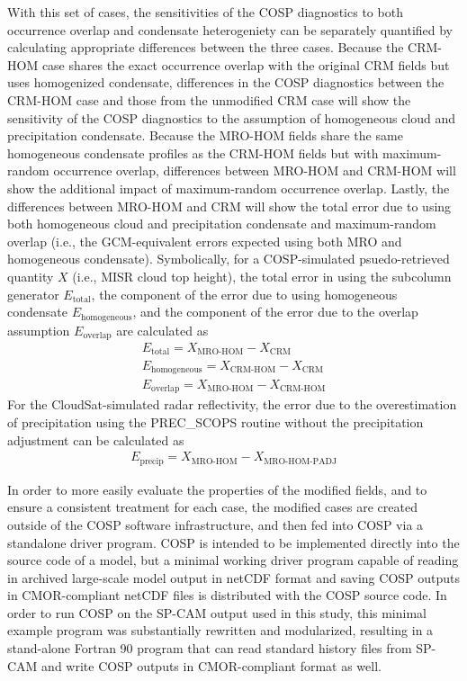 With this set of cases, the sensitivities of the COSP diagnostics to
both occurrence overlap and condensate heterogeniety can be separately
quantified by calculating appropriate differences between the three
cases. Because the CRM-HOM case shares the exact occurrence overlap with
the original CRM fields but uses homogenized condensate, differences in
the COSP diagnostics between the CRM-HOM case and those from the
unmodified CRM case will show the sensitivity of the COSP diagnostics to
the assumption of homogeneous cloud and precipitation condensate.
Because the MRO-HOM fields share the same homogeneous condensate
profiles as the CRM-HOM fields but with maximum-random occurrence
overlap, differences between MRO-HOM and CRM-HOM will show the
additional impact of maximum-random occurrence overlap. Lastly, the
differences between MRO-HOM and CRM will show the total error due to
using both homogeneous cloud and precipitation condensate and
maximum-random overlap (i.e., the GCM-equivalent errors expected using
both MRO and homogeneous condensate). Symbolically, for a COSP-simulated
psuedo-retrieved quantity \(X\) (i.e., MISR cloud top height), the total
error in using the subcolumn generator \(E_\textrm{total}\), the
component of the error due to using homogeneous condensate
\(E_\textrm{homogeneous}\), and the component of the error due to the
overlap assumption \(E_\textrm{overlap}\) are calculated as
\[\begin{gathered}
    E_\textrm{total} = X_\textrm{MRO-HOM} - X_\textrm{CRM} \\
    E_\textrm{homogeneous} = X_\textrm{CRM-HOM} - X_\textrm{CRM} \\
    E_\textrm{overlap} = X_\textrm{MRO-HOM} - X_\textrm{CRM-HOM}\end{gathered}\]
For the CloudSat-simulated radar reflectivity, the error due to the
overestimation of precipitation using the PREC\_SCOPS routine without
the precipitation adjustment can be calculated as \[\begin{gathered}
    E_\textrm{precip} = X_\textrm{MRO-HOM} - X_\textrm{MRO-HOM-PADJ}\end{gathered}\]

In order to more easily evaluate the properties of the modified fields,
and to ensure a consistent treatment for each case, the modified cases
are created outside of the COSP software infrastructure, and then fed
into COSP via a standalone driver program. COSP is intended to be
implemented directly into the source code of a model, but a minimal
working driver program capable of reading in archived large-scale model
output in netCDF format and saving COSP outputs in CMOR-compliant netCDF
files is distributed with the COSP source code. In order to run COSP on
the SP-CAM output used in this study, this minimal example program was
substantially rewritten and modularized, resulting in a stand-alone
Fortran 90 program that can read standard history files from SP-CAM and
write COSP outputs in CMOR-compliant format as well.

